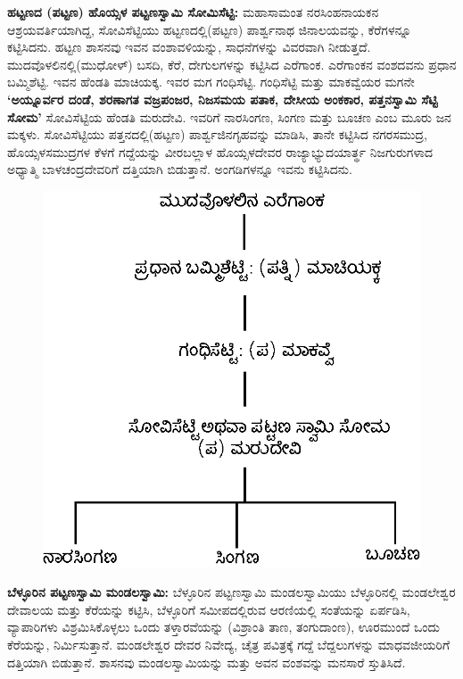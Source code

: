\textbf{ಹಟ್ಟಣದ (ಪಟ್ಟಣ) ಹೊಯ್ಸಳ ಪಟ್ಟಣಸ್ವಾಮಿ ಸೋಮಿಸೆಟ್ಟಿ: } ಮಹಾಸಾಮಂತ ನರಸಿಂಹನಾಯಕನ ಆಶ್ರಯವರ್ತಿ\-ಯಾಗಿದ್ದ, ಸೋವಿಸೆಟ್ಟಿಯು ಹಟ್ಟಣದಲ್ಲಿ(ಪಟ್ಟಣ) ಪಾರ್ಶ್ವನಾಥ ಜಿನಾಲಯವನ್ನು, ಕೆರೆಗಳನ್ನೂ ಕಟ್ಟಿಸಿದನು. ಹಟ್ಟಣ ಶಾಸನವು ಇವನ ವಂಶಾವಳಿಯನ್ನು, ಸಾಧನೆಗಳನ್ನು ವಿವರವಾಗಿ ನೀಡುತ್ತದೆ. ಮುದವೊಳಲಿನಲ್ಲಿ(ಮುಧೋಳ್​) ಬಸದಿ, ಕೆರೆ, ದೇಗುಲಗಳನ್ನು ಕಟ್ಟಿಸಿದ ಎರೆಗಾಂಕ. ಎರೆಗಾಂಕನ ವಂಶದವನು ಪ್ರಧಾನ ಬಮ್ಮಿಶೆಟ್ಟಿ. ಇವನ ಹೆಂಡತಿ ಮಾಚಿಯಕ್ಕ. ಇವರ ಮಗ ಗಂಧಿಸೆಟ್ಟಿ. ಗಂಧಿಸೆಟ್ಟಿ ಮತ್ತು ಮಾಕವ್ವೆಯರ ಮಗನೇ \textbf{‘ಅಯ್ನೂರ್ವರ ದಂಡೆ, ಶರಣಾಗತ ವಜ್ರಪಂಜರ, ನಿಜಸಮಯ ಪತಾಕ, ದೇಸೀಯ ಅಂಕಕಾರ, ಪತ್ತನಸ್ವಾಮಿ ಸೆಟ್ಟಿ ಸೋಮ’} ಸೋವಿಸೆಟ್ಟಿಯ ಹೆಂಡತಿ ಮರುದೇವಿ. ಇವರಿಗೆ ನಾರಸಿಂಗಣ, ಸಿಂಗಣ ಮತ್ತು ಬೂಚಣ ಎಂಬ ಮೂರು ಜನ ಮಕ್ಕಳು. ಸೋವಿಸೆಟ್ಟಿಯು ಪತ್ತನದಲ್ಲಿ(ಹಟ್ಟಣ) ಪಾರ್ಶ್ವಜಿನಗೃಹವನ್ನು ಮಾಡಿಸಿ, ತಾನೇ ಕಟ್ಟಿಸಿದ ನಗರಸಮುದ್ರ, ಹೊಯ್ಸಳಸಮುದ್ರಗಳ ಕೆಳಗೆ ಗದ್ದೆಯನ್ನು ವೀರಬಲ್ಲಾಳ ಹೊಯ್ಸಳದೇವರ ರಾಜ್ಯಾಭ್ಯುದಯಾರ್ತ್ಥ ನಿಜಗುರುಗಳಾದ ಅಧ್ಯಾತ್ಮಿ ಬಾಳಚಂದ್ರದೇವರಿಗೆ ದತ್ತಿಯಾಗಿ ಬಿಡುತ್ತಾನೆ. ಅಂಗಡಿಗಳನ್ನೂ ಇವನು ಕಟ್ಟಿಸಿದನು.

\begin{figure}[!h]
\includegraphics{images/chap8/chap8fig1.jpeg}
\end{figure}

\textbf{ಬೆಳ್ಳೂರಿನ ಪಟ್ಟಣಸ್ವಾಮಿ ಮಂಡಲಸ್ವಾಮಿ: } ಬೆಳ್ಳೂರಿನ ಪಟ್ಟಣಸ್ವಾಮಿ ಮಂಡಲಸ್ವಾಮಿಯು ಬೆಳ್ಳೂರಿನಲ್ಲಿ ಮಂಡಲೇಶ್ವರ ದೇವಾಲಯ ಮತ್ತು ಕೆರೆಯನ್ನು ಕಟ್ಟಿಸಿ, ಬೆಳ್ಳೂರಿಗೆ ಸಮೀಪದಲ್ಲಿರುವ ಆರಣಿಯಲ್ಲಿ ಸಂತೆಯನ್ನು ಏರ್ಪಡಿಸಿ, ವ್ಯಾಪಾರಿಗಳು ವಿಶ್ರಮಿಸಿಕೊಳ್ಳಲು ಒಂದು ತಳ್ತಾರವೆಯನ್ನು (ವಿಶ್ರಾಂತಿ ತಾಣ, ತಂಗುದಾಂಣ), ಊರಮುಂದೆ ಒಂದು ಕೆರೆಯನ್ನು, ನಿರ್ಮಿಸುತ್ತಾನೆ. ಮಂಡಲೇಶ್ವರ ದೇವರ ನಿವೇದ್ಯ, ಚೈತ್ರ ಪವಿತ್ರಕ್ಕೆ ಗದ್ದೆ ಬೆದ್ದಲುಗಳನ್ನು ಮಾಧವಜೀಯರಿಗೆ ದತ್ತಿಯಾಗಿ ಬಿಡುತ್ತಾನೆ. ಶಾಸನವು ಮಂಡಲಸ್ವಾಮಿಯನ್ನು ಮತ್ತು ಅವನ ವಂಶವನ್ನು ಮನಸಾರೆ ಸ್ತುತಿಸಿದೆ.

